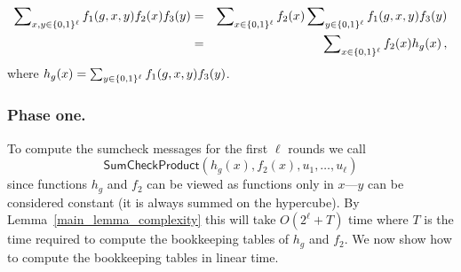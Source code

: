 \begin{eqnarray}
 \sum\nolimits_{x,y\in\{0,1\}^\ell}f_1(g,x,y)f_2(x)f_3(y)&=&\sum\nolimits_{x\in\{0,1\}^\ell}f_2(x)\sum\nolimits_{y\in\{0,1\}^\ell}f_1(g,x,y) f_3(y)\nonumber\\
&=& \sum\nolimits_{x\in\{0,1\}^\ell}f_2(x)   h_g(x)\nonumber\,,
\end{eqnarray}
where $h_g(x) = \sum_{y\in\{0,1\}^\ell}f_1(g,x,y) f_3(y)$. 


\subsubsection{Phase one.} 
To compute the sumcheck messages for the first $\ell$ rounds we  call $$\textsf{SumCheckProduct}(h_g(x),f_2(x),u_1,\ldots,u_\ell)$$ since functions $h_g$ and $f_2$ can be viewed as functions only in $x$---$y$ can be considered constant (it is always summed on the hypercube). By Lemma~\ref{main_lemma_complexity} this will take $O(2^\ell+T)$ time where $T$ is the time required to compute the bookkeeping tables of $h_g$ and $f_2$. We now show how to compute the bookkeeping tables in linear time.

